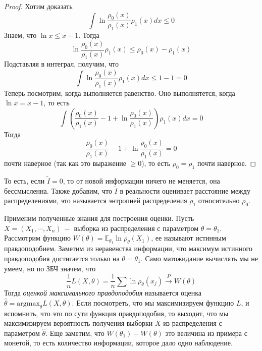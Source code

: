 \begin{proof}
Хотим доказать
\[
    \int \ln \frac{\rho_0\left(x\right)}{\rho_1\left(x\right)} \rho_1\left(x\right) dx \leq 0 
\]
Знаем, что $\ln x \leq x - 1$. Тогда 
\[
    \ln \frac{\rho_0\left(x\right)}{\rho_1\left(x\right)} \rho_1\left(x\right) \leq \rho_0\left(x\right) - \rho_1\left(x\right)
\]
Подставляя в интеграл, получим, что 
\[
    \int \ln \frac{\rho_0\left(x\right)}{\rho_1\left(x\right)} \rho_1\left(x\right) dx \leq 1 - 1 = 0
\]
Теперь посмотрим, когда выполняется равенство. Оно выполнятется, когда $\ln x = x - 1$, то есть 
\[
    \int \left(\frac{\rho_0\left(x\right)}{\rho_1\left(x\right)} - 1 + \ln \frac{\rho_0\left(x\right)}{\rho_1\left(x\right)}\right) \rho_1\left(x\right) dx = 0
\]
Тогда 
\[
    \frac{\rho_0\left(x\right)}{\rho_1\left(x\right)} - 1 + \ln \frac{\rho_0\left(x\right)}{\rho_1\left(x\right)} = 0
\]
почти наверное (так как это выражение $\geq 0$), то есть $\rho_0 = \rho_1$ почти наверное.
\end{proof}
То есть, если $\tilde{I} = 0$, то от новой информации ничего не меняется, она бессмысленна. Также добавим, что $\tilde{I}$ в реальности оценивает расстояние между распределениями, это называется энтропией распределения $\rho_1$ относительно $\rho_0$.
\par 
Применим полученные знания для построения оценки. Пусть $X = \left(X_1, \cdots, X_n\right) \ - $ выборка из распределения с параметром $\theta = \theta_1$. Рассмотрим функцию $W\left(\theta\right) = \mathbb{E}_{\theta_1} \ln \rho_\theta\left(X_1\right)$, ее называют истинным правдоподобием. Заметим из неравенства информации, что максимум истинного правдоподобия достигается только на $\theta = \theta_1$. Само матожидание вычислять мы не умеем, но по ЗБЧ значем, что 
\[
    \frac 1 n L\left(X, \theta\right) = \frac 1 n \sum \ln \rho_\theta\left(x_j\right) \xrightarrow{P} W\left(\theta\right)
\]
Тогда \textit{оценкой максимального правдоподобия} называется оценка $\widehat{\theta} = \text{argmax}_\theta L\left(X, \theta\right)$. Если посмотреть, что мы максимизируем функцию $L$, и вспомнить, что это по сути функция правдоподобия, то выходит, что мы максимизируем вероятность получения выборки $X$ из распределения с параметром $\widehat{\theta}$. Еще заметим, что $W\left(\theta_1\right) - W\left(\theta\right)$ это величина из примера с монетой, то есть количество информации, которое дало одно наблюдение.


